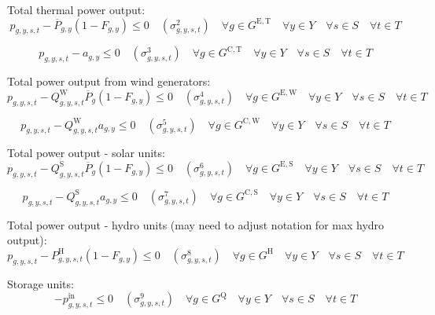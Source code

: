 \documentclass{article}
\newcommand{\sGeneratorsExistingThermal}{G^{\mathrm{E,T}}}
\newcommand{\sGeneratorsExistingWind}{G^{\mathrm{E,W}}}
\newcommand{\sGeneratorsExistingSolar}{G^{\mathrm{E,S}}}
\newcommand{\sGeneratorsCandidateThermal}{G^{\mathrm{C,T}}}
\newcommand{\sGeneratorsCandidateWind}{G^{\mathrm{C,W}}}
\newcommand{\sGeneratorsCandidateSolar}{G^{\mathrm{C,S}}}
\newcommand{\sGeneratorsHydro}{G^{\mathrm{H}}}
\newcommand{\sStorage}{G^{\mathrm{Q}}}
\newcommand{\sYears}{Y}
\newcommand{\sScenarios}{S}
\newcommand{\sIntervals}{T}
\newcommand{\iGenerator}{g}
\newcommand{\iYear}{y}
\newcommand{\iScenario}{s}
\newcommand{\iInterval}{t}
\newcommand{\cPowerOutputMax}[1][\iGenerator,\iYear]{\overline{P}_{#1}}
\newcommand{\cCapacityFactorWind}[1][\iGenerator,\iYear,\iScenario,\iInterval]{Q_{#1}^{\mathrm{W}}}
\newcommand{\cCapacityFactorSolar}[1][\iGenerator,\iYear,\iScenario,\iInterval]{Q_{#1}^{\mathrm{S}}}
\newcommand{\cRetirementIndicator}[1][\iGenerator,\iYear]{F_{#1}}
\newcommand{\cPowerOutputHydro}[1][\iGenerator,\iYear,\iScenario,\iInterval]{P^{\mathrm{H}}_{#1}}
\newcommand{\vPower}[1][\iGenerator,\iYear,\iScenario,\iInterval]{p_{#1}}
\newcommand{\vPowerIn}[1][\iGenerator,\iYear,\iScenario,\iInterval]{p^{\mathrm{in}}_{#1}}
\newcommand{\vInstalledCapacityTotal}[1][\iGenerator,\iYear]{a_{#1}}
\newcommand{\dMaxPowerOutputExistingThermal}[1][\iGenerator,\iYear,\iScenario,\iInterval]{\sigma_{#1}^{2}}
\newcommand{\dMaxPowerOutputCandidateThermal}[1][\iGenerator,\iYear,\iScenario,\iInterval]{\sigma_{#1}^{3}}
\newcommand{\dMaxPowerOutputWindExisting}[1][\iGenerator,\iYear,\iScenario,\iInterval]{\sigma_{#1}^{4}}
\newcommand{\dMaxPowerOutputWindCandidate}[1][\iGenerator,\iYear,\iScenario,\iInterval]{\sigma_{#1}^{5}}
\newcommand{\dMaxPowerOutputSolarExisting}[1][\iGenerator,\iYear,\iScenario,\iInterval]{\sigma_{#1}^{6}}
\newcommand{\dMaxPowerOutputSolarCandidate}[1][\iGenerator,\iYear,\iScenario,\iInterval]{\sigma_{#1}^{7}}
\newcommand{\dMaxPowerOutputHydro}[1][\iGenerator,\iYear,\iScenario,\iInterval]{\sigma_{#1}^{8}}
\newcommand{\dNonNegativeCharging}[1][\iGenerator,\iYear,\iScenario,\iInterval]{\sigma_{#1}^{9}}
\newcommand{\sScenarioSets}{\quad \forall \iYear \in \sYears \quad \forall \iScenario \in \sScenarios \quad \forall \iInterval \in \sIntervals}
\begin{document}
Total thermal power output:
\begin{equation}
	\vPower - \cPowerOutputMax \left(1 - \cRetirementIndicator\right) \leq 0 \quad (\dMaxPowerOutputExistingThermal) \quad \forall \iGenerator \in \sGeneratorsExistingThermal \sScenarioSets
\end{equation}

\begin{equation}
	\vPower - \vInstalledCapacityTotal \leq 0 \quad (\dMaxPowerOutputCandidateThermal) \quad \forall \iGenerator \in \sGeneratorsCandidateThermal \sScenarioSets
\end{equation}

Total power output from wind generators:
\begin{equation}
	\vPower - \cCapacityFactorWind \cPowerOutputMax[\iGenerator] \left(1 - \cRetirementIndicator\right) \leq 0 \quad (\dMaxPowerOutputWindExisting) \quad \forall \iGenerator \in \sGeneratorsExistingWind \sScenarioSets
\end{equation}

\begin{equation}
	\vPower - \cCapacityFactorWind \vInstalledCapacityTotal \leq 0 \quad (\dMaxPowerOutputWindCandidate) \quad \forall \iGenerator \in \sGeneratorsCandidateWind \sScenarioSets
\end{equation}

Total power output - solar units:
\begin{equation}
	\vPower - \cCapacityFactorSolar \cPowerOutputMax[\iGenerator] \left(1 - \cRetirementIndicator\right) \leq 0 \quad (\dMaxPowerOutputSolarExisting) \quad \forall \iGenerator \in \sGeneratorsExistingSolar \sScenarioSets
\end{equation}

\begin{equation}
	\vPower - \cCapacityFactorSolar \vInstalledCapacityTotal \leq 0 \quad (\dMaxPowerOutputSolarCandidate) \quad \forall \iGenerator \in \sGeneratorsCandidateSolar \sScenarioSets
\end{equation}

Total power output - hydro units (may need to adjust notation for max hydro output):
\begin{equation}
	\vPower - \cPowerOutputHydro \left(1 - \cRetirementIndicator\right) \leq 0 \quad (\dMaxPowerOutputHydro) \quad \forall \iGenerator \in \sGeneratorsHydro \sScenarioSets
\end{equation}

Storage units:
\begin{equation}
	-\vPowerIn \leq 0 \quad (\dNonNegativeCharging) \quad \forall \iGenerator \in \sStorage \sScenarioSets
\end{equation}
\end{document}
